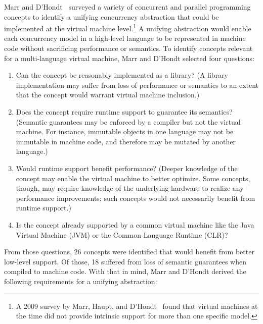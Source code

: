 \documentclass{sig-alternate}
\begin{document}
Marr and D'Hondt~\cite{Marr2012} surveyed a variety of concurrent and parallel programming concepts to identify a unifying concurrency abstraction that could be implemented at the virtual machine level.\footnote{A 2009 survey by Marr, Haupt, and D'Hondt~\cite{Marr2009} found that virtual machines at the time did not provide intrinsic support for more than one specific model.} A unifying abstraction would enable each concurrency model in a high-level language to be represented in machine code without sacrificing performance or semantics. To identify concepts relevant for a multi-language virtual machine, Marr and D'Hondt selected four questions:

\begin{enumerate}
  \item Can the concept be reasonably implemented as a library? (A library implementation may suffer from loss of performance or semantics to an extent that the concept would warrant virtual machine inclusion.)

  \item Does the concept require runtime support to guarantee its semantics? (Semantic guarantees may be enforced by a compiler but not the virtual machine. For instance, immutable objects in one language may not be immutable in machine code, and therefore may be mutated by another language.)

  \item Would runtime support benefit performance? (Deeper knowledge of the concept may enable the virtual machine to better optimize. Some concepts, though, may require knowledge of the underlying hardware to realize any performance improvements; such concepts would not necessarily benefit from runtime support.)

  \item Is the concept already supported by a common virtual machine like the Java Virtual Machine (JVM) or the Common Language Runtime (CLR)?
\end{enumerate}

From those questions, 26 concepts were identified that would benefit from better low-level support. Of those, 18 suffered from loss of semantic guarantees when compiled to machine code. With that in mind, Marr and D'Hondt derived the following requirements for a unifying abstraction:
\end{document}
